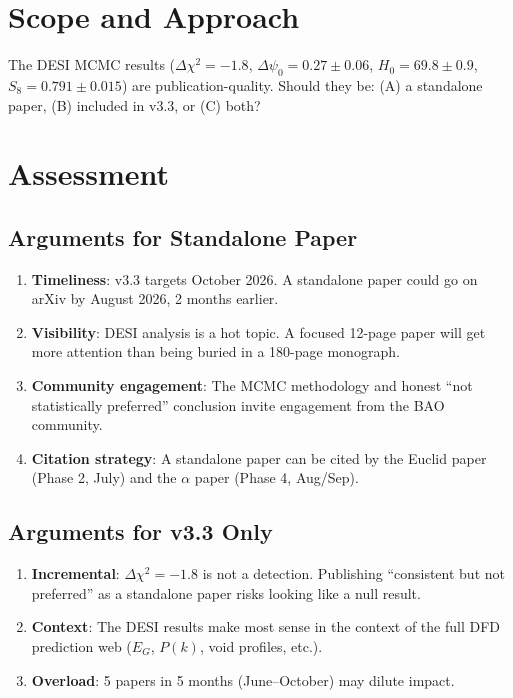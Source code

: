 \documentclass[11pt,a4paper]{article}
\begin{document}
\section{Scope and Approach}

The DESI MCMC results ($\Delta\chi^2 = -1.8$, $\Delta\psi_0 = 0.27 \pm 0.06$, $H_0 = 69.8 \pm 0.9$, $S_8 = 0.791 \pm 0.015$) are publication-quality. Should they be: (A) a standalone paper, (B) included in v3.3, or (C) both?

\section{Assessment}

\subsection{Arguments for Standalone Paper}

\begin{enumerate}
\item \textbf{Timeliness}: v3.3 targets October 2026. A standalone paper could go on arXiv by August 2026, 2 months earlier.
\item \textbf{Visibility}: DESI analysis is a hot topic. A focused 12-page paper will get more attention than being buried in a 180-page monograph.
\item \textbf{Community engagement}: The MCMC methodology and honest ``not statistically preferred'' conclusion invite engagement from the BAO community.
\item \textbf{Citation strategy}: A standalone paper can be cited by the Euclid paper (Phase 2, July) and the $\alpha$ paper (Phase 4, Aug/Sep).
\end{enumerate}

\subsection{Arguments for v3.3 Only}

\begin{enumerate}
\item \textbf{Incremental}: $\Delta\chi^2 = -1.8$ is not a detection. Publishing ``consistent but not preferred'' as a standalone paper risks looking like a null result.
\item \textbf{Context}: The DESI results make most sense in the context of the full DFD prediction web ($E_G$, $P(k)$, void profiles, etc.).
\item \textbf{Overload}: 5 papers in 5 months (June--October) may dilute impact.
\end{enumerate}
\end{document}
